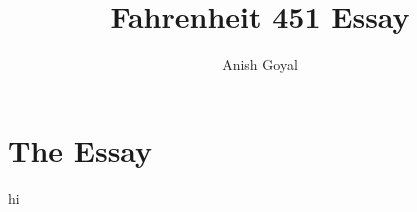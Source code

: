 \documentclass[stu]{apa7}
\title{Fahrenheit 451 Essay}
\author{Anish Goyal}
\begin{document}
\maketitle
\section{The Essay}
hi
\end{document}
